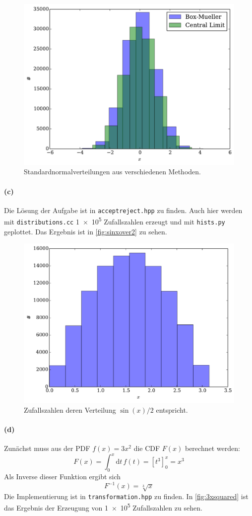 \documentclass{scrartcl}
\begin{document}
\begin{figure}[H]
    \centering
    \includegraphics[width=.5\textwidth]{plots/gaussian.pdf}
    \caption{Standardnormalverteilungen aus verschiedenen Methoden.}
    \label{fig:gaussian}
\end{figure}

\paragraph{(c)} Die Lösung der Aufgabe ist in \texttt{acceptreject.hpp} zu finden. Auch hier werden mit \texttt{distributions.cc} \num{1e5} Zufallszahlen erzeugt und mit \texttt{hists.py} geplottet. Das Ergebnis ist in \autoref{fig:sinxover2} zu sehen.

\begin{figure}[H]
    \centering
    \includegraphics[width=.5\textwidth]{plots/sinxover2.pdf}
    \caption{Zufallszahlen deren Verteilung $\sin(x)/2$ entspricht.}
    \label{fig:sinxover2}
\end{figure}

\paragraph{(d)} Zunächst muss aus der PDF $f(x) = 3x^2$ die CDF $F(x)$ berechnet werden:
\begin{equation}
    F(x) = \int_0^x\mathrm{d}t\,f(t) = \left[t^3\right]_0^x = x^3
\end{equation}
Als Inverse dieser Funktion ergibt sich
\begin{equation}
    F^{-1}(x) = \sqrt[3]{x}
\end{equation}
Die Implementierung ist in \texttt{transformation.hpp} zu finden. In \autoref{fig:3xsquared} ist das Ergebnis der Erzeugung von \num{1e5} Zufallszahlen zu sehen.
\end{document}
